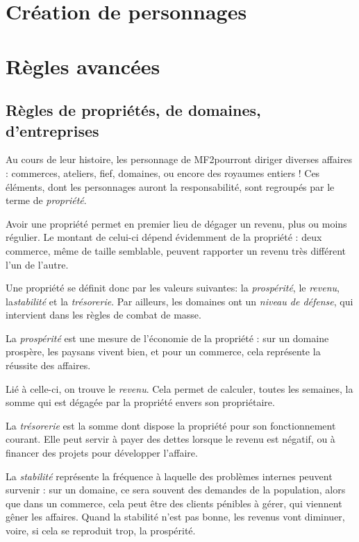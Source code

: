 \documentclass[10pt,a4paper]{book}
\newcommand{\titre}{MF2}
\begin{document}
\chapter{Création de personnages}
\begin{multicols}{2}
\end{multicols}
\chapter{Règles avancées}
\begin{multicols}{2}
\section{Règles de propriétés, de domaines, d'entreprises}
Au cours de leur histoire, les personnage de \titre pourront diriger diverses affaires : commerces, ateliers, fief, domaines, ou encore des royaumes entiers ! Ces éléments, dont les personnages auront la responsabilité, sont regroupés par le terme de \emph{propriété}. 

Avoir une propriété permet en premier lieu de dégager un revenu, plus ou moins régulier. Le montant de celui-ci dépend évidemment de la propriété : deux commerce, même de taille semblable, peuvent rapporter un revenu très différent l'un de l'autre.

Une propriété se définit donc par les valeurs suivantes: la \emph{prospérité}, le \emph{revenu}, la\emph{stabilité} et la \emph{trésorerie}. Par ailleurs, les domaines ont un \emph{niveau de défense}, qui intervient dans les règles de combat de masse.

La \emph{prospérité} est une mesure de l'économie de la propriété : sur un domaine prospère, les paysans vivent bien, et pour un commerce, cela représente la réussite des affaires.

Lié à celle-ci, on trouve le \emph{revenu}. Cela permet de calculer, toutes les semaines, la somme qui est dégagée par la propriété envers son propriétaire. 

La \emph{trésorerie} est la somme dont dispose la propriété pour son fonctionnement courant. Elle peut servir à payer des dettes lorsque le revenu est négatif, ou à financer des projets pour développer l'affaire. 

La \emph{stabilité} représente la fréquence à laquelle des problèmes internes peuvent survenir : sur un domaine, ce sera souvent des demandes de la population, alors que dans un commerce, cela peut être des clients pénibles à gérer, qui viennent gêner les affaires. Quand la stabilité n'est pas bonne, les revenus vont diminuer, voire, si cela se reproduit trop, la prospérité.


\end{multicols}
\end{document}
